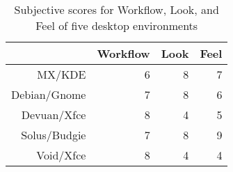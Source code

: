 \begin{table}[ht]
\centering
\caption{Subjective scores for Workflow, Look, and Feel of five desktop environments}
\label{tab:scores}
\begin{tabular}{|rrrr|}
 \hline
 \vspace{2pt}
 & Workflow & Look & Feel \\ 
  \hline
  \vspace{2pt}
MX/KDE & 6 & 8 & 7 \\
Debian/Gnome & 7  & 8 & 6 \\
Devuan/Xfce & 8 & 4 & 5 \\
Solus/Budgie & 7 & 8 & 9 \\
Void/Xfce & 8 & 4 & 4 \\
   \hline
\end{tabular}
\end{table}

